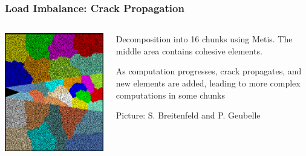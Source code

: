 \begin{frame}[fragile]
\frametitle{Load Imbalance: Crack Propagation}
\begin{columns}
\begin{column}{0.5\textwidth}
\includegraphics[width=\textwidth]{../figures/chunkGraph16}
\end{column}
\begin{column}{0.5\textwidth}
Decomposition into 16 chunks using Metis. The middle area contains cohesive elements.

As computation progresses, crack propagates, and new elements are added, leading to more complex computations in some chunks

Picture: S. Breitenfeld and P. Geubelle
\end{column}
\end{columns}
\end{frame}


